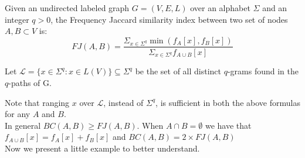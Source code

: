 \begin{definizione}
	Given an undirected labeled graph $G = (V,E,L)$ over an alphabet $\Sigma$ and an integer $q > 0$, the Frequency Jaccard similarity index between two set of nodes $A, B \subset V$ is:
	\begin{equation}\label{jaccard-sub}	
	FJ(A,B) = \frac{ \Sigma_{x \in \Sigma^{q}} \min(f_{A}[x], f_{B}[x]) }{ \Sigma_{x \in \Sigma^{q}} f_{A \cup B}[x] }
	\end{equation}
\end{definizione}

Let $\mathcal{L} = \{ x \in \Sigma^{q} : x \in L(V) \} \subseteq \Sigma^{q}$ be the set of all distinct $q$-grams found in the $q$-paths of G. 

Note that ranging $x$ over $\mathcal{L}$, instead of $\Sigma^{q}$, is sufficient in both the above formulas for any $A$ and $B$.\\

In general $BC(A,B) \geq FJ(A,B)$. When $A \cap B = \emptyset$ we have that $f_{A \cup B}[x] = f_{A}[x] + f_{B}[x]$ and $BC(A,B) = 2 \times FJ(A,B)$\\




Now we present a little example to better understand.\\



